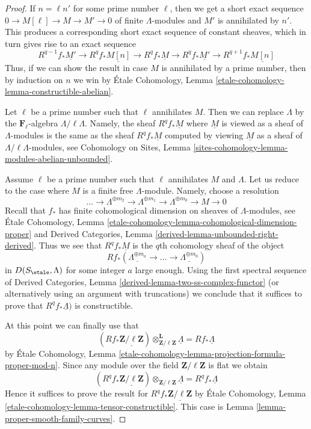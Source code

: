 \begin{proof}
If $n = \ell n'$ for some prime number $\ell$, then
we get a short exact sequence $0 \to M[\ell] \to M \to M' \to 0$
of finite $\Lambda$-modules and $M'$ is annihilated by $n'$.
This produces a corresponding short exact sequence of constant
sheaves, which in turn gives rise to an exact sequence
$$
R^{q - 1}f_*\underline{M'} \to
R^qf_*\underline{M[n]} \to
R^qf_*\underline{M} \to
R^qf_*\underline{M'} \to
R^{q + 1}f_*\underline{M[n]}
$$
Thus, if we can show the result in case $M$ is annihilated by
a prime number, then by induction on $n$ we win by
\'Etale Cohomology, Lemma \ref{etale-cohomology-lemma-constructible-abelian}.

\medskip\noindent
Let $\ell$ be a prime number such that $\ell$ annihilates $M$.
Then we can replace $\Lambda$ by the $\mathbf{F}_\ell$-algebra
$\Lambda/\ell \Lambda$. Namely, the sheaf $R^qf_*\underline{M}$
where $\underline{M}$ is viewed as a sheaf of $\Lambda$-modules
is the same as the sheaf $R^qf_*\underline{M}$ computed by
viewing $\underline{M}$ as a sheaf of $\Lambda/\ell \Lambda$-modules, see
Cohomology on Sites, Lemma
\ref{sites-cohomology-lemma-modules-abelian-unbounded}.

\medskip\noindent
Assume $\ell$ be a prime number such that $\ell$ annihilates $M$ and $\Lambda$.
Let us reduce to the case where $M$ is a finite free $\Lambda$-module.
Namely, choose a resolution
$$
\ldots \to
\Lambda^{\oplus m_2} \to
\Lambda^{\oplus m_1} \to
\Lambda^{\oplus m_0} \to
M \to 0
$$
Recall that $f_*$ has finite cohomological dimension on sheaves of
$\Lambda$-modules, see
\'Etale Cohomology, Lemma
\ref{etale-cohomology-lemma-cohomological-dimension-proper}
and
Derived Categories, Lemma \ref{derived-lemma-unbounded-right-derived}.
Thus we see that $R^qf_*\underline{M}$ is the $q$th cohomology
sheaf of the object
$$
Rf_*(\underline{\Lambda^{\oplus m_a}} \to \ldots \to
\underline{\Lambda^{\oplus m_0}})
$$
in $D(S_\etale, \Lambda)$ for some integer $a$ large enough.
Using the first spectral sequence of
Derived Categories, Lemma \ref{derived-lemma-two-ss-complex-functor}
(or alternatively using an argument with truncations)
we conclude that it suffices to prove that $R^qf_*\underline{\Lambda})$
is constructible.

\medskip\noindent
At this point we can finally use that
$$
(Rf_*\underline{\mathbf{Z}/\ell\mathbf{Z}})
\otimes_{\mathbf{Z}/\ell\mathbf{Z}}^\mathbf{L} \underline{\Lambda} =
Rf_*\underline{\Lambda}
$$
by \'Etale Cohomology, Lemma
\ref{etale-cohomology-lemma-projection-formula-proper-mod-n}.
Since any module over the field $\mathbf{Z}/\ell\mathbf{Z}$
is flat we obtain
$$
(R^qf_*\underline{\mathbf{Z}/\ell\mathbf{Z}})
\otimes_{\mathbf{Z}/\ell\mathbf{Z}} \underline{\Lambda} =
R^qf_*\underline{\Lambda}
$$
Hence it suffices to prove the result for
$R^qf_*\underline{\mathbf{Z}/\ell\mathbf{Z}}$
by \'Etale Cohomology, Lemma \ref{etale-cohomology-lemma-tensor-constructible}.
This case is Lemma \ref{lemma-proper-smooth-family-curves}.
\end{proof}






